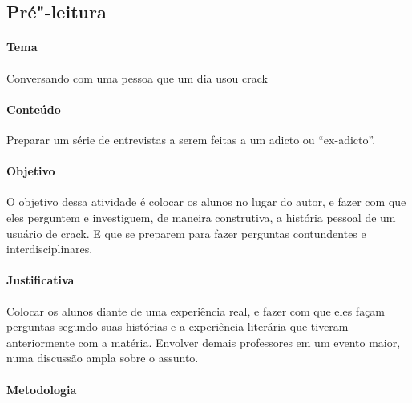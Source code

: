\documentclass[12pt]{extarticle}
\begin{document}
\subsection{Pré"-leitura}

\paragraph{Tema} Conversando com uma pessoa que um dia usou crack

\paragraph{Conteúdo} Preparar um série de entrevistas a serem feitas a um
	adicto ou ``ex-adicto''. 

\paragraph{Objetivo} O objetivo dessa atividade é colocar os alunos no lugar 
	do autor, e fazer com que eles perguntem e investiguem, de maneira construtiva, 
	a história pessoal de um usuário de crack. E que se preparem 
	para fazer perguntas contundentes e interdisciplinares. 

\paragraph{Justificativa} Colocar os alunos diante de uma experiência real, 
	e fazer com que eles façam perguntas segundo suas histórias e a experiência
	literária que tiveram anteriormente com a matéria. Envolver demais 
	professores em um evento maior, numa discussão ampla sobre o assunto. 

\paragraph{Metodologia}
\end{document}
